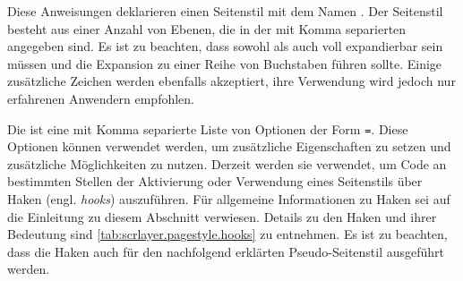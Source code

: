 \begin{Declaration}
\end{Declaration}
%
%
Diese Anweisungen deklarieren einen Seitenstil mit dem Namen
. Der Seitenstil besteht aus einer Anzahl von Ebenen,
die in der mit Komma separierten  angegeben sind. Es ist zu
beachten, dass sowohl  als auch
 voll expandierbar sein müssen und die Expansion zu einer
Reihe von Buchstaben führen sollte. Einige zusätzliche Zeichen werden
ebenfalls akzeptiert, ihre Verwendung wird jedoch nur erfahrenen Anwendern
empfohlen.

Die  ist eine mit Komma separierte Liste von Optionen der
Form \texttt{=}. Diese Optionen können verwendet
werden, um zusätzliche Eigenschaften zu setzen und zusätzliche Möglichkeiten
zu nutzen. Derzeit werden sie verwendet, um \mbox{Code} an bestimmten Stellen
der Aktivierung oder Verwendung eines Seitenstils über Haken
(engl. \emph{hooks}) auszuführen. Für allgemeine Informationen zu Haken sei
auf die Einleitung zu diesem Abschnitt verwiesen. Details zu den Haken und
ihrer Bedeutung sind \autoref{tab:scrlayer.pagestyle.hooks} zu entnehmen. Es
ist zu beachten, dass die Haken auch für den nachfolgend erklärten
Pseudo-Seitenstil
%
 ausgeführt werden.

